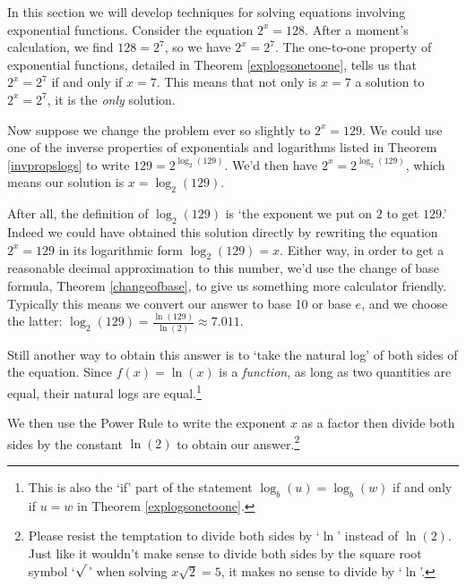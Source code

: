\documentclass{ximera}
\begin{document}
	\author{Stitz-Zeager}




\setcounter{footnote}{0}

\label{ExponentialEquationsandInequalities}

In this section we will develop techniques for solving equations involving exponential functions.  Consider the equation $2^{x} = 128$.  After a moment's calculation, we find $128 = 2^{7}$, so we have $2^{x} = 2^{7}$.  The one-to-one property of exponential functions, detailed in Theorem \ref{explogsonetoone}, tells us that $2^{x} = 2^{7}$ if and only if $x=7$.  This means that not only is $x=7$ a solution to $2^{x} = 2^{7}$, it is the \textit{only} solution.  

\smallskip

Now suppose we change the problem ever so slightly to $2^{x} = 129$.  We could use one of the inverse properties of exponentials and logarithms listed in Theorem \ref{invpropslogs} to write $129 = 2^{\log_{2}(129)}$.  We'd then have $2^{x} = 2^{\log_{2}(129)}$, which means our solution is $x = \log_{2}(129)$. 

\smallskip

After all, the definition of $\log_{2}(129)$ is `the exponent we put on $2$ to get $129$.' Indeed we could have obtained this solution directly by rewriting the equation $2^{x} = 129$ in its logarithmic form $\log_{2}(129) = x$.  Either way, in order to get a reasonable decimal approximation to this number, we'd use the change of base formula, Theorem \ref{changeofbase}, to give us something more calculator friendly.  Typically this means we convert our answer to base 10 or base $e$, and we choose the latter: $\log_{2}(129) = \frac{\ln(129)}{\ln(2)} \approx 7.011$.  

\smallskip

Still another way to obtain this answer is to `take the natural log' of both sides of the equation. Since $f(x) = \ln(x)$ is a \textit{function}, as long as two quantities are equal, their natural logs are equal.\footnote{This is also the `if' part of the statement $\log_{b}(u) = \log_{b}(w)$ if and only if $u=w$ in Theorem \ref{explogsonetoone}.} 

\smallskip

We then use the Power Rule to write the exponent $x$ as a factor then divide both sides by the constant $\ln(2)$ to obtain our answer.\footnote{ Please resist the temptation to divide both sides by `$\ln$' instead of $\ln(2)$.   Just like it wouldn't make sense to divide both sides by the square root symbol `$\sqrt{\vphantom{2} \,}$' when solving $x \sqrt{2} = 5$, it makes no sense to divide by `$\ln$'.}
\end{document}
